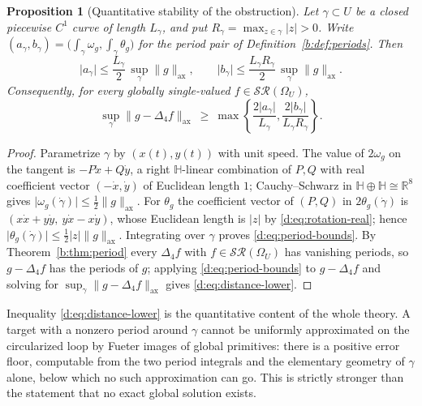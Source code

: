 \documentclass[11pt,a4paper]{article}
\numberwithin{equation}{section}
\newtheorem{proposition}[theorem]{Proposition}
\theoremstyle{definition}
\theoremstyle{remark}
\theoremstyle{plain}
\newcommand{\HH}{\mathbb H}
\newcommand{\RR}{\mathbb R}
\newcommand{\lap}{\Delta_4}
\newcommand{\SR}{\mathcal{SR}}
\newcommand{\Om}{\Omega}
\newcommand{\om}{\omega}
\newcommand{\thet}{\theta}
\newcommand{\axn}[1]{\lVert #1\rVert_{\mathrm{ax}}}   %
\newcommand{\abs}[1]{\lvert #1\rvert}
\begin{document}
\begin{proposition}[Quantitative stability of the obstruction]
\label{d:prop:period-bounds}
Let $\gamma\subset U$ be a closed piecewise $C^1$ curve of length
$L_\gamma$, and put $R_\gamma=\max_{z\in\gamma}\abs z>0$.  Write
$(a_\gamma,b_\gamma)=\bigl(\int_\gamma\om_g,\int_\gamma\thet_g\bigr)$ for
the period pair of Definition~\ref{b:def:periods}.  Then
\begin{equation}
 \abs{a_\gamma}\le\frac{L_\gamma}{2}\,\sup_\gamma\axn g,
 \qquad
 \abs{b_\gamma}\le\frac{L_\gamma R_\gamma}{2}\,\sup_\gamma\axn g .
 \label{d:eq:period-bounds}
\end{equation}
Consequently, for \emph{every} globally single-valued $f\in\SR(\Om_U)$,
\begin{equation}
 \sup_\gamma\axn{g-\lap f}\ \ge\
 \max\left\{\frac{2\abs{a_\gamma}}{L_\gamma},
             \frac{2\abs{b_\gamma}}{L_\gamma R_\gamma}\right\} .
 \label{d:eq:distance-lower}
\end{equation}
\end{proposition}

\begin{proof}
Parametrize $\gamma$ by $(x(t),y(t))$ with unit speed.  The value of
$2\om_g$ on the tangent is $-P\dot x+Q\dot y$, a right
$\HH$-linear combination of $P,Q$ with real coefficient vector
$(-\dot x,\dot y)$ of Euclidean length $1$; Cauchy--Schwarz in
$\HH\oplus\HH\cong\RR^8$ gives
$\abs{\om_g(\dot\gamma)}\le\tfrac12\axn g$.  For $\thet_g$ the coefficient
vector of $(P,Q)$ in $2\thet_g(\dot\gamma)$ is
$(x\dot x+y\dot y,\ y\dot x-x\dot y)$, whose Euclidean length is $\abs z$
by \eqref{d:eq:rotation-real}; hence
$\abs{\thet_g(\dot\gamma)}\le\tfrac12\abs z\axn g$.  Integrating over
$\gamma$ proves \eqref{d:eq:period-bounds}.  By Theorem~\ref{b:thm:period}
every $\lap f$ with $f\in\SR(\Om_U)$ has vanishing periods, so
$g-\lap f$ has the periods of $g$; applying
\eqref{d:eq:period-bounds} to $g-\lap f$ and solving for
$\sup_\gamma\axn{g-\lap f}$ gives \eqref{d:eq:distance-lower}.
\end{proof}

Inequality \eqref{d:eq:distance-lower} is the quantitative content of the
whole theory.  A target with a nonzero period around $\gamma$ cannot be
uniformly approximated on the circularized loop by Fueter images of global
primitives: there is a positive error floor, computable from the two period
integrals and the elementary geometry of $\gamma$ alone, below which no
such approximation can go.  This is strictly stronger than the statement
that no exact global solution exists.
\end{document}

